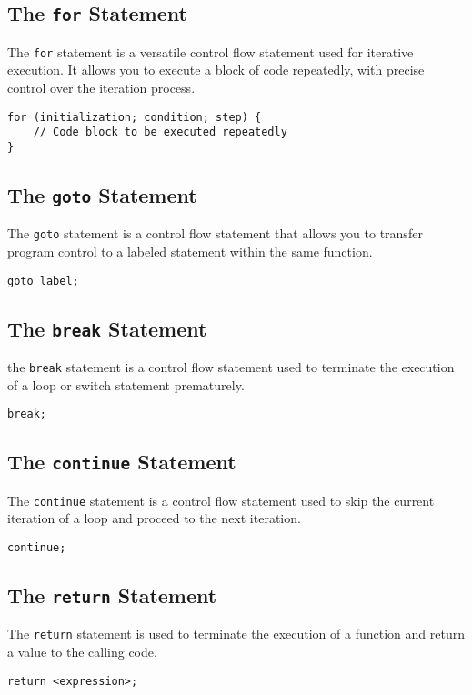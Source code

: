\documentclass[11pt,A4]{article}
\begin{document}
        \subsection{The \texttt{for} Statement}
        The \texttt{for} statement is a versatile control flow statement used for iterative execution. It allows you to execute a block of code repeatedly, with precise control over the iteration process. 
        \begin{lstlisting}
for (initialization; condition; step) {
    // Code block to be executed repeatedly
}
        \end{lstlisting}
        
        \subsection{The \texttt{goto} Statement}
        The \texttt{goto} statement is a control flow statement that allows you to transfer program control to a labeled statement within the same function.
        \begin{lstlisting}
goto label;
        \end{lstlisting}
    
        \subsection{The \texttt{break} Statement}
        the \texttt{break} statement is a control flow statement used to terminate the execution of a loop or switch statement prematurely.
        \begin{lstlisting}
break;
        \end{lstlisting}
        
        \subsection{The \texttt{continue} Statement}
        The \texttt{continue} statement is a control flow statement used to skip the current iteration of a loop and proceed to the next iteration. 
        \begin{lstlisting}
continue;
        \end{lstlisting}
        
        \subsection{The \texttt{return} Statement}
        The \texttt{return} statement is used to terminate the execution of a function and return a value to the calling code.
        \begin{lstlisting}
return <expression>;
        \end{lstlisting}
\end{document}
